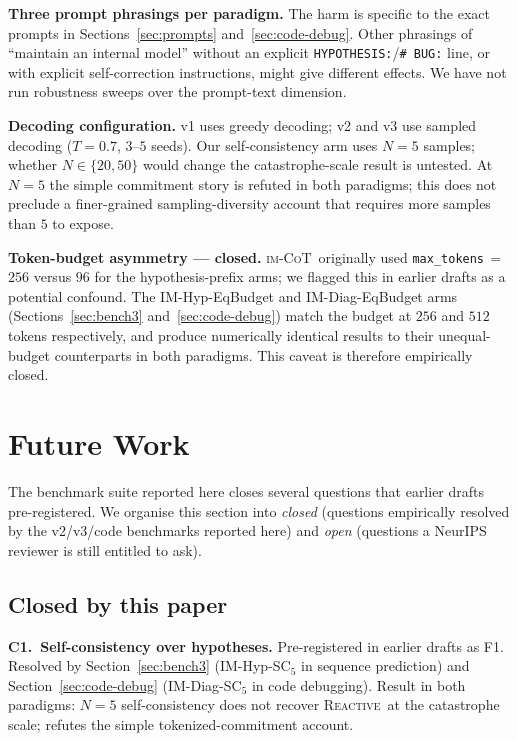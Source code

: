 \documentclass[11pt]{article}
\newcommand{\imcot}{\textsc{im-CoT}}
\newcommand{\reactive}{\textsc{Reactive}}
\begin{document}
\textbf{Three prompt phrasings per paradigm.}  The harm is
specific to the exact prompts in Sections~\ref{sec:prompts}
and~\ref{sec:code-debug}.  Other phrasings of ``maintain an
internal model'' without an explicit
\verb|HYPOTHESIS:|/\verb|# BUG:| line, or with explicit
self-correction instructions, might give different effects.  We
have not run robustness sweeps over the prompt-text dimension.

\textbf{Decoding configuration.}  v1 uses greedy decoding;
v2 and v3 use sampled decoding ($T = 0.7$, $3$--$5$ seeds).  Our
self-consistency arm uses $N = 5$ samples; whether $N \in
\{20, 50\}$ would change the catastrophe-scale result is
untested.  At $N = 5$ the simple commitment story is refuted
in both paradigms; this does not preclude a finer-grained
sampling-diversity account that requires more samples than $5$
to expose.

\textbf{Token-budget asymmetry --- closed.}  \imcot\ originally
used \texttt{max\_tokens}\,$=$\,$256$ versus $96$ for the
hypothesis-prefix arms; we flagged this in earlier drafts as a
potential confound.  The IM-Hyp-EqBudget and IM-Diag-EqBudget
arms (Sections~\ref{sec:bench3} and~\ref{sec:code-debug})
match the budget at $256$ and $512$ tokens respectively, and
produce numerically identical results to their unequal-budget
counterparts in both paradigms.  This caveat is therefore
empirically closed.

\section{Future Work}
\label{sec:future}

The benchmark suite reported here closes several questions that
earlier drafts pre-registered.  We organise this section into
\emph{closed} (questions empirically resolved by the v2/v3/code
benchmarks reported here) and \emph{open} (questions a NeurIPS
reviewer is still entitled to ask).

\subsection*{Closed by this paper}

\textbf{C1.\ Self-consistency over hypotheses.}  Pre-registered
in earlier drafts as F1.  Resolved by Section~\ref{sec:bench3}
(IM-Hyp-SC$_5$ in sequence prediction) and
Section~\ref{sec:code-debug} (IM-Diag-SC$_5$ in code debugging).
Result in both paradigms: $N = 5$ self-consistency does not
recover \reactive\ at the catastrophe scale; refutes the simple
tokenized-commitment account.
\end{document}
